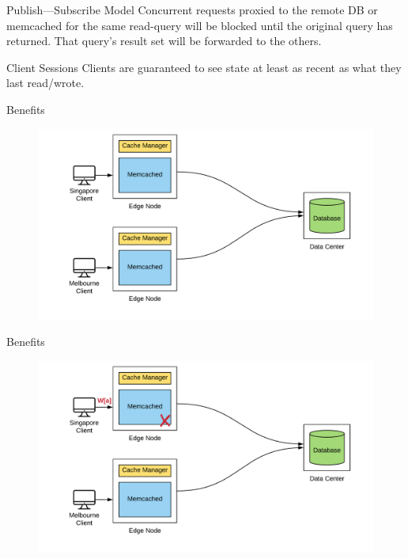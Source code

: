 \documentclass[10pt]{beamer}
\begin{document}
\begin{frame}[fragile]{Publish---Subscribe Model}
Concurrent requests proxied to the remote DB or memcached for the same read-query will be blocked until the original query has returned.
That query's result set will be \alert{forwarded} to the others.
\end{frame}

\begin{frame}[fragile]{Client Sessions}
Clients are guaranteed to see state at least as recent as what they last read/wrote.
    \begin{itemize}
    \end{itemize}
\end{frame}

\begin{frame}{Benefits}
    \begin{figure}
        \center
        \hspace*{-1.5cm}
        \includegraphics[scale=0.17]{apollo_ec_dbl}
    \end{figure}
\end{frame}

\begin{frame}{Benefits}
    \begin{figure}
        \center
        \hspace*{-1.5cm}
        \includegraphics[scale=0.17]{apollo_ec_upd}
    \end{figure}
\end{frame}
\end{document}
